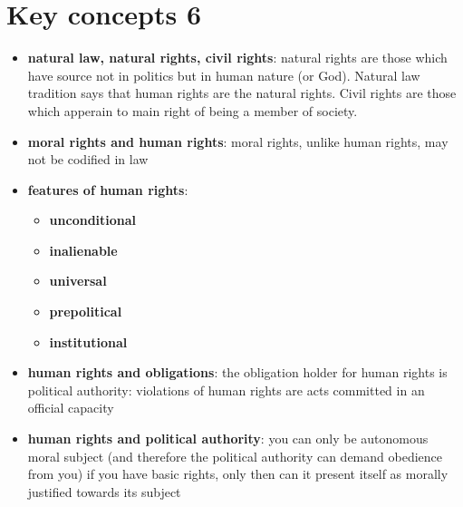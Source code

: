 \section{Key concepts 6}

\begin{itemize}
	\item \textbf{natural law, natural rights, civil rights}: natural
	 rights are those which have source not in politics but in human
	 nature (or God). Natural law tradition says that human rights are the
	 natural rights. Civil rights are those which apperain to main right of
	 being a member of society.
	\item \textbf{moral rights and human rights}: moral rights, unlike
	 human rights, may not be codified in law
	\item \textbf{features of human rights}:
	\begin{itemize}
		\item \textbf{unconditional}
		\item \textbf{inalienable}
		\item \textbf{universal}
		\item \textbf{prepolitical}
		\item \textbf{institutional}
	\end{itemize}
	\item \textbf{human rights and obligations}: the obligation holder for
	 human rights is political authority: violations of human rights are
	 acts committed in an official capacity
	\item \textbf{human rights and political authority}: you can only be
	 autonomous moral subject (and therefore the political authority can
	 demand obedience from you) if you have basic rights, only then can it
	 present itself as morally justified towards its subject
\end{itemize}
